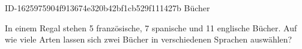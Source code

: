 \begin{exercise}
      {ID-1625975904f913674e320b42bf1cb529f111427b}
      {Bücher}
  \ifproblem\problem\par
    In einem Regal stehen 5 französische, 7 spanische und 11 englische Bücher.
    Auf wie viele Arten lassen sich zwei Bücher in verschiedenen Sprachen
    auswählen?
  \fi
\end{exercise}
